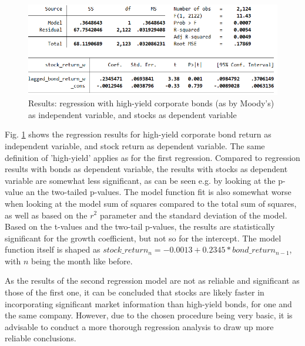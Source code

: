 \begin{figure}[h]
	\centering
	\includegraphics[trim={0 0 0 0},clip,width=1.0\linewidth]{figures/regression-results/regression-high-yield-ccc-d-moodies-stocks-as-dependent.PNG}
	\caption{Results: regression with high-yield corporate bonds (as by Moody's) as independent variable, and stocks as dependent variable}
	\label{fig:regression-high-yield-ccc-d-moodies-stocks-as-dependent.PNG}
\end{figure}

Fig. \ref{fig:regression-high-yield-ccc-d-moodies-stocks-as-dependent.PNG} shows the regression results for high-yield corporate bond return as independent variable, and stock return as dependent variable. The same definition of 'high-yield' applies as for the first regression. Compared to regression results with bonds as dependent variable, the results with stocks as dependent variable are somewhat less significant, as can be seen e.g. by looking at the p-value an the two-tailed p-values. The model function fit is also somewhat worse when looking at the model sum of squares compared to the total sum of squares, as well as based on the $r^2$ parameter and the standard deviation of the model. Based on the t-values and the two-tail p-values, the results are statistically significant for the growth coefficient, but not so for the intercept. The model function itself is shaped as $stock\_return_{n} = -0.0013 + 0.2345 * bond\_return_{n-1}$, with $n$ being the month like before. 

As the results of the second regression model are not as reliable and significant as those of the first one, it can be concluded that stocks are likely faster in incorporating significant market information than high-yield bonds, for one and the same company. However, due to the chosen procedure being very basic, it is advisable to conduct a more thorough regression analysis to draw up more reliable conclusions. 

